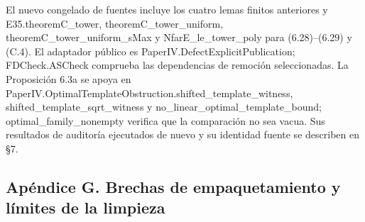 \documentclass[spanish,11pt,a4paper]{article}
\newcounter{none}
\begin{document}
El nuevo congelado de fuentes incluye los cuatro lemas finitos anteriores y {\ttfamily\small E35.\discretionary{\hbox{\ensuremath{\hookrightarrow}}}{}{}theoremC\_\discretionary{\hbox{\ensuremath{\hookrightarrow}}}{}{}tower}, {\ttfamily\small theoremC\_\discretionary{\hbox{\ensuremath{\hookrightarrow}}}{}{}tower\_\discretionary{\hbox{\ensuremath{\hookrightarrow}}}{}{}uniform}, {\ttfamily\small theoremC\_\discretionary{\hbox{\ensuremath{\hookrightarrow}}}{}{}tower\_\discretionary{\hbox{\ensuremath{\hookrightarrow}}}{}{}uniform\_\discretionary{\hbox{\ensuremath{\hookrightarrow}}}{}{}sMax} y {\ttfamily\small NfarE\_\discretionary{\hbox{\ensuremath{\hookrightarrow}}}{}{}le\_\discretionary{\hbox{\ensuremath{\hookrightarrow}}}{}{}tower\_\discretionary{\hbox{\ensuremath{\hookrightarrow}}}{}{}poly} para (6.28)--(6.29) y (C.4). El adaptador público es {\ttfamily\small PaperIV.\discretionary{\hbox{\ensuremath{\hookrightarrow}}}{}{}DefectExplic\discretionary{\hbox{\ensuremath{\hookrightarrow}}}{}{}itPublicatio\discretionary{\hbox{\ensuremath{\hookrightarrow}}}{}{}n}; FDCheck.ASCheck comprueba las dependencias de remoción seleccionadas. La Proposición 6.3a se apoya en {\ttfamily\small PaperIV.\discretionary{\hbox{\ensuremath{\hookrightarrow}}}{}{}OptimalTempl\discretionary{\hbox{\ensuremath{\hookrightarrow}}}{}{}ateObstructi\discretionary{\hbox{\ensuremath{\hookrightarrow}}}{}{}on.\discretionary{\hbox{\ensuremath{\hookrightarrow}}}{}{}shifted\_\discretionary{\hbox{\ensuremath{\hookrightarrow}}}{}{}template\_\discretionary{\hbox{\ensuremath{\hookrightarrow}}}{}{}witness}, {\ttfamily\small shifted\_\discretionary{\hbox{\ensuremath{\hookrightarrow}}}{}{}template\_\discretionary{\hbox{\ensuremath{\hookrightarrow}}}{}{}sqrt\_\discretionary{\hbox{\ensuremath{\hookrightarrow}}}{}{}witness} y {\ttfamily\small no\_\discretionary{\hbox{\ensuremath{\hookrightarrow}}}{}{}linear\_\discretionary{\hbox{\ensuremath{\hookrightarrow}}}{}{}optimal\_\discretionary{\hbox{\ensuremath{\hookrightarrow}}}{}{}template\_\discretionary{\hbox{\ensuremath{\hookrightarrow}}}{}{}bound}; {\ttfamily\small optimal\_\discretionary{\hbox{\ensuremath{\hookrightarrow}}}{}{}family\_\discretionary{\hbox{\ensuremath{\hookrightarrow}}}{}{}nonempty} verifica que la comparación no sea vacua. Sus resultados de auditoría ejecutados de nuevo y su identidad fuente se describen en §7.

\subsection{Apéndice G. Brechas de empaquetamiento y límites de la limpieza}\label{apendice-g.-brechas-de-empaquetamiento-y-limites-de-la-limpieza}
\end{document}
